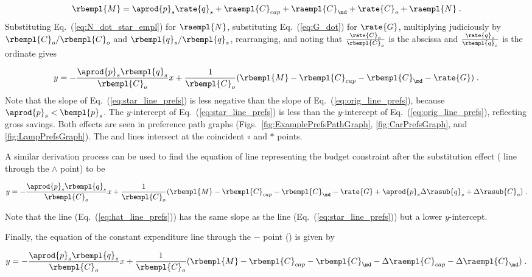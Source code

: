 \begin{equation}
  \rbempl{M} = \aprod{p}_s \rate{q}_s + \raempl{C}_{cap} + \raempl{C}_{\md} + \rate{C}_o + \raempl{N} \; .
\end{equation}
%
Substituting Eq.~(\ref{eq:N_dot_star_empl}) for $\raempl{N}$,
substituting Eq.~(\ref{eq:G_dot}) for $\rate{G}$,
multiplying judiciously by $\rbempl{C}_o/\rbempl{C}_o$ and $\rbempl{q}_s/\rbempl{q}_s$, 
rearranging, and noting that 
$\frac{\rate{C}_o}{\rbempl{C}_o}$ is the abscissa and 
$\frac{\rate{q}_s}{\rbempl{q}_s}$ is the ordinate gives

\begin{equation} \label{eq:star_line_prefs}
  y = - \frac{\aprod{p}_s \rbempl{q}_s}{\rbempl{C}_o} x
         + \frac{1}{\rbempl{C}_o} (\rbempl{M} - \rbempl{C}_{cap} - \rbempl{C}_{\md} - \rate{G}) \; .
\end{equation}
%
Note that the slope of Eq.~(\ref{eq:star_line_prefs}) is less negative
than the slope of Eq.~(\ref{eq:orig_line_prefs}), 
because $\aprod{p}_s < \bempl{p}_s$.
The $y$-intercept of Eq.~(\ref{eq:star_line_prefs}) is less than the 
$y$-intercept of Eq.~(\ref{eq:orig_line_prefs}),
reflecting gross savings.
Both effects are seen in
preference path graphs 
(Figs.~\ref{fig:ExamplePrefsPathGraph}, \ref{fig:CarPrefsGraph}, and \ref{fig:LampPrefsGraph}).
The \circcirc{} and \starstar{} lines intersect at the coincident $\circ$ and $*$ points.

A similar derivation process can be used to find the equation of 
line representing the budget constraint
after the substitution effect (\hathat{} line through the $\wedge$ point) to be

\begin{equation} \label{eq:hat_line_prefs}
  y = - \frac{\aprod{p}_s \rbempl{q}_s}{\rbempl{C}_o} x
         + \frac{1}{\rbempl{C}_o} (\rbempl{M} - \rbempl{C}_{cap} - \rbempl{C}_{\md} 
                                   - \rate{G} + \aprod{p}_s \Delta \rasub{q}_s + \Delta \rasub{C}_o) \; .
\end{equation}

Note that the \hathat{} line (Eq.~(\ref{eq:hat_line_prefs})) has the same slope as 
the \starstar{} line (Eq.~(\ref{eq:star_line_prefs}))
but a lower $y$-intercept.

Finally, the equation of the constant expenditure line through the 
$-$ point (\barbar{}) is given by

\begin{equation} \label{eq:bar_line_prefs}
  y = - \frac{\aprod{p}_s \rbempl{q}_s}{\rbempl{C}_o} x
        + \frac{1}{\rbempl{C}_o} (\rbempl{M} - \rbempl{C}_{cap} - \rbempl{C}_{\md} 
                                   - \Delta \raempl{C}_{cap} - \Delta \raempl{C}_{\md}) \; .
\end{equation}


